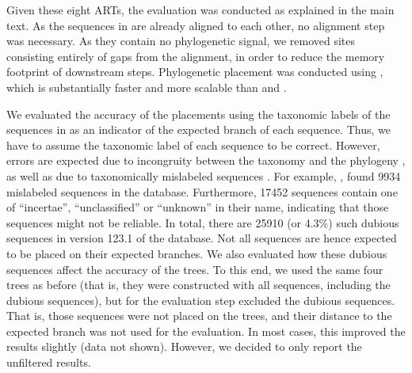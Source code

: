 Given these eight \acp{ART}, the evaluation was conducted as explained in the main text.
As the sequences in  are already aligned to each other, no alignment step was necessary.
As they contain no phylogenetic signal, we removed sites consisting entirely of gaps from the alignment,
in order to reduce the memory footprint of downstream steps.
Phylogenetic placement was conducted using  \citep{Barbera2018},
which is substantially faster and more scalable
than  \citep{Berger2011} and  \citep{Matsen2010}.

We evaluated the accuracy of the placements using the taxonomic labels of the sequences in 
as an indicator of the expected branch of each sequence.
Thus, we have to assume the taxonomic label of each sequence to be correct.
However, errors are expected due to incongruity between the taxonomy and the phylogeny \citep{Moreira2000},
as well as due to taxonomically mislabeled sequences \citep{Kozlov2016}.
For example,  \citep{Kozlov2016},
found \num{9 934} mislabeled sequences in the  database.
Furthermore, \num{17 452} sequences contain one of ``incertae'', ``unclassified'' or ``unknown'' in their name,
indicating that those sequences might not be reliable.
In total, there are \num{25 910} (or \num{4.3}\%) such dubious sequences in version 123.1 of the  database.
Not all sequences are hence expected to be placed on their expected branches.
We also evaluated how these dubious sequences affect the accuracy of the trees.
To this end, we used the same four trees as before
(that is, they were constructed with all sequences, including the dubious sequences),
but for the evaluation step excluded the dubious sequences.
That is, those sequences were not placed on the trees,
and their distance to the expected branch was not used for the evaluation.
In most cases, this improved the results slightly (data not shown).
However, we decided to only report the unfiltered results.


